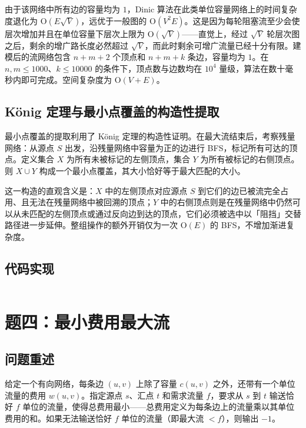 \documentclass[12pt, a4paper]{academics}
\begin{document}
由于该网络中所有边的容量均为 $1$，Dinic 算法在此类单位容量网络上的时间复杂度退化为 $\mathrm{O}(E\sqrt{V})$，远优于一般图的 $\mathrm{O}(V^2E)$。这是因为每轮阻塞流至少会使层次增加并且在单位容量下层次上限为 $\mathrm{O}(\sqrt{V})$——直觉上，经过 $\sqrt{V}$ 轮层次图之后，剩余的增广路长度必然超过 $\sqrt{V}$，而此时剩余可增广流量已经十分有限。建模后的流网络包含 $n + m + 2$ 个顶点和 $n + m + k$ 条边，容量均为 $1$。在 $n, m \le 1000$、$k \le 10000$ 的条件下，顶点数与边数均在 $10^4$ 量级，算法在数十毫秒内即可完成。空间复杂度为 $\mathrm{O}(V + E)$。

\subsection{K\"onig 定理与最小点覆盖的构造性提取}

最小点覆盖的提取利用了 K\"onig 定理的构造性证明。在最大流结束后，考察残量网络：从源点 $S$ 出发，沿残量网络中容量为正的边进行 BFS，标记所有可达的顶点。定义集合 $X$ 为所有未被标记的左侧顶点，集合 $Y$ 为所有被标记的右侧顶点。则 $X \cup Y$ 构成一个最小点覆盖，其大小恰好等于最大匹配的大小。

这一构造的直观含义是：$X$ 中的左侧顶点对应源点 $S$ 到它们的边已被流完全占用、且无法在残量网络中被回溯的顶点；$Y$ 中的右侧顶点则是在残量网络中仍然可以从未匹配的左侧顶点或通过反向边到达的顶点，它们必须被选中以「阻挡」交替路径进一步延伸。整组操作的额外开销仅为一次 $\mathrm{O}(E)$ 的 BFS，不增加渐进复杂度。

\subsection{代码实现}

\inputminted{c++}{../src/p3_bipartite.cpp}

\section{题四：最小费用最大流}

\subsection{问题重述}

给定一个有向网络，每条边 $(u, v)$ 上除了容量 $c(u, v)$ 之外，还带有一个单位流量的费用 $w(u, v)$。指定源点 $s$、汇点 $t$ 和需求流量 $f$，要求从 $s$ 到 $t$ 输送恰好 $f$ 单位的流量，使得总费用最小——总费用定义为每条边上的流量乘以其单位费用的和。如果无法输送恰好 $f$ 单位的流量（即最大流 $< f$），则输出 $-1$。
\end{document}

